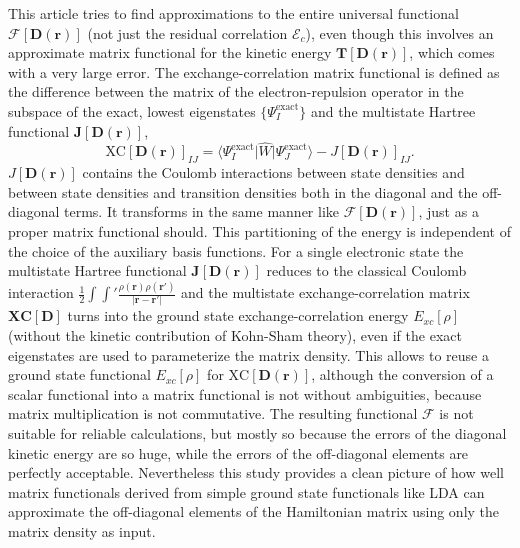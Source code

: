 \documentclass[journal=jacsat,manuscript=article]{achemso}
\newcommand\m[1]{\mathbf{#1}}
\renewcommand\vec[1]{\mathbf{#1}}
\begin{document}
This article tries to find approximations to the entire universal functional $\m{\mathcal{F}}[\m{D}(\vec{r})]$
(not just the residual correlation $\m{\mathcal{E}}_c$), even though this involves an approximate
matrix functional for the kinetic energy $\m{T}[\m{D}(\vec{r})]$, which comes with a very large error.
The exchange-correlation matrix functional
is defined as the difference between the matrix of the electron-repulsion operator in the subspace of the exact, lowest eigenstates
$\{\Psi_{I}^{\text{exact}}\}$ and
the multistate Hartree functional $\m{J}[\m{D}(\vec{r})]$,
\begin{equation}
 \text{XC}[\m{D}(\vec{r})]_{IJ} = \langle \Psi_I^{\text{exact}} \vert \hat{W} \vert \Psi_J^{\text{exact}} \rangle - J[\m{D}(\vec{r})]_{IJ}.
\end{equation}
$J[\m{D}(\vec{r})]$ contains the Coulomb interactions between state densities
and between state densities and transition densities both in the diagonal and the off-diagonal terms. It transforms 
in the same manner like $\mathcal{F}[\m{D}(\vec{r})]$, just as a proper matrix functional should.
This partitioning of the energy is independent of the choice of the auxiliary basis functions.
For a single electronic state the multistate Hartree functional $\m{J}[\m{D}(\vec{r})]$ reduces to the classical Coulomb interaction
$\frac{1}{2} \int \int' \frac{\rho(\vec{r}) \rho(\vec{r}')}{\vert \vec{r} - \vec{r}' \vert}$ and the multistate exchange-correlation matrix $\m{\text{XC}}[\m{D}]$
turns into the ground state exchange-correlation energy $E_{xc}[\rho]$ (without the kinetic contribution of Kohn-Sham theory),
even if the exact eigenstates are used to parameterize the matrix density.
This allows to reuse a ground state functional $E_{xc}[\rho]$ for $\text{XC}[\m{D}(\vec{r})]$, although the conversion of
a scalar functional into a matrix functional is not without ambiguities, because matrix multiplication is not commutative.
The resulting functional $\mathcal{F}$ is not suitable for reliable calculations,
but mostly so because the errors of the diagonal kinetic
energy are so huge,
while the errors of the off-diagonal elements are perfectly acceptable.
Nevertheless this study provides a clean picture of how well matrix functionals derived from simple ground state functionals
like LDA can approximate the off-diagonal elements of the Hamiltonian matrix using only the matrix density as input.
\end{document}
